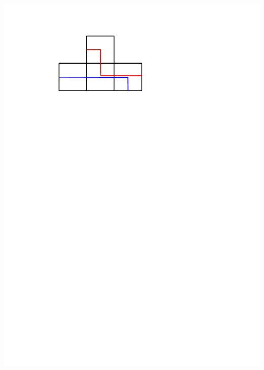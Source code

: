 \documentclass[portrait,final,a0paper,fontscale=0.25]{baposter}
\theoremstyle{definition}
\begin{document}
\begin{poster}
{\hspace*{.15cm}\includegraphics[scale=.32]{Kiss}
}
\end{poster}
\end{document}
